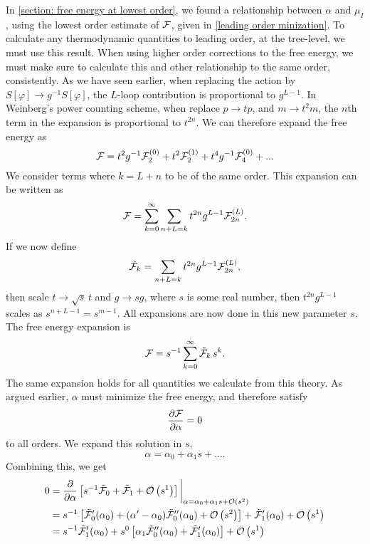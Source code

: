In \autoref{section: free energy at lowest order}, we found a relationship between $\alpha$ and $\mu_I$, using the lowest order estimate of $\mathcal{F}$, given in \cref{leading order minization}.
To calculate any thermodynamic quantities to leading order, at the tree-level, we must use this result.
When using higher order corrections to the free energy, we must make sure to calculate this and other relationship to the same order, consistently.
As we have seen earlier, when replacing the action by $S[\varphi] \rightarrow g^{-1}S[\varphi]$, the $L$-loop contribution is proportional to $g^{L-1}$.
In Weinberg's power counting scheme, when replace $p \rightarrow t p$, and $m \rightarrow t^2 m$, the $n$th term in the expansion is proportional to $t^{2n}$.
We can therefore expand the free energy as
\begin{equation}
    \mathcal{F} = t^2 g^{-1} \mathcal{F}_2^{(0)} + t^2 \mathcal{F}_2^{(1)} + t^4 g^{-1} \mathcal{F}_4^{(0)}
    + ...
\end{equation}
We consider terms where $k = L + n$ to be of the same order.
This expansion can be written as
\begin{equation}
    \mathcal{F} = \sum_{k=0}^\infty \sum_{n+L=k} t^{2n} g^{L-1} \mathcal{F}_{2n}^{(L)}.
\end{equation}
If we now define
\begin{equation}
    \tilde {\mathcal{F}}_k = \sum_{n+L=k} t^{2n} g^{L-1} \mathcal{F}_{2n}^{(L)},
\end{equation}
then scale $t \rightarrow \sqrt{s} \, t$ and $g \rightarrow s g$, where $s$ is some real number, then $t^{2n}g^{L-1}$ scales as $s^{n+L-1} = s^{m-1}$.
All expansions are now done in this new parameter $s$.
The free energy expansion is
\begin{equation}
    \mathcal{F} = s^{-1}\sum_{k = 0}^\infty \tilde {\mathcal{F}}_k \, s^{k}.
\end{equation}
The same expansion holds for all quantities we calculate from this theory.
As argued earlier, $\alpha$ must minimize the free energy, and therefore satisfy
\begin{equation}
    \diffp{\Ef}{\alpha} = 0
\end{equation}
to all orders.
We expand this solution in $s$,
\begin{equation}
    \alpha = \alpha_0 + \alpha_1 s + \dots.
\end{equation}
Combining this, we get
\begin{align*}
    0 &
    = 
    \diffp{}{\alpha}
    \left[
        s^{-1}\tilde \Ef_0
        + 
        \tilde \Ef_1
        +
        \Oh[1]{s}
    \right]
    \bigg|_{\alpha=\alpha_0 + \alpha_1 s + \Oh{s}} 
    \\
    & = 
    s^{-1 }
    \left[
        \tilde \Ef_0'(\alpha_0)
        +
        (\alpha' - \alpha_0)
        \tilde \Ef_0''(\alpha_0)
        +
        \Oh[2]{s}
    \right]
    +
    \tilde\Ef_1'(\alpha_0)
    +
    \Oh[1]{s} \\
    &
    =
    s^{-1} \tilde\Ef_1'(\alpha_0)
    + s^{0}
    \left[
        \alpha_1
        \tilde \Ef_0''(\alpha_0)
        +
    \tilde\Ef_1'(\alpha_0)
    \right]
    +
    \Oh[1]{s}
\end{align*}
